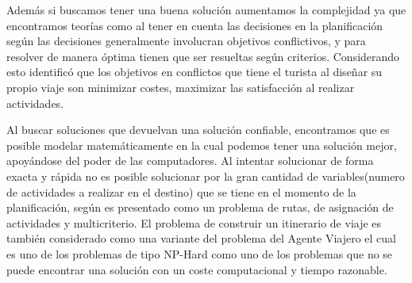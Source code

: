 Además si buscamos tener una buena solución aumentamos la complejidad ya que encontramos teorías como al tener en cuenta las decisiones en la planificación según  las decisiones generalmente involucran objetivos conflictivos, y para resolver de manera óptima tienen que ser resueltas según criterios. Considerando esto  identificó que los objetivos en conflictos que tiene el turista al diseñar su propio viaje son minimizar costes, maximizar las satisfacción al realizar actividades. 

Al buscar soluciones que devuelvan una solución confiable, encontramos que es posible modelar matemáticamente en la cual podemos tener una solución mejor, apoyándose del poder de las computadores. Al intentar solucionar de forma exacta y rápida no es posible solucionar por la gran cantidad de variables(numero de actividades a realizar en el destino) que se tiene en el momento de la planificación, según  es presentado como un problema de rutas, de asignación de actividades y multicriterio. El problema de construir un itinerario de viaje es también considerado como una variante del problema del Agente Viajero el cual es uno de los problemas de tipo NP-Hard como uno de los problemas que no se puede encontrar una solución con un coste computacional y tiempo razonable. 


 
